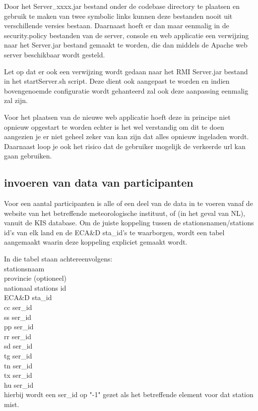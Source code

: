 \documentclass{article}
\begin{document}
Door het Server$_-$xxxx.jar bestand onder de codebase directory te plaatsen en gebruik te maken van 
twee symbolic links kunnen deze bestanden nooit uit verschillende versies bestaan. Daarnaast hoeft er dan maar 
eenmalig in de security.policy bestanden van de server, console en web applicatie een verwijzing naar het 
Server.jar bestand gemaakt te worden, die dan middels de Apache web server beschikbaar wordt gesteld.

Let op dat er ook een verwijzing wordt gedaan naar het RMI Server.jar bestand in het startServer.sh script. 
Deze dient ook aangepast te worden en indien bovengenoemde configuratie wordt gehanteerd zal ook deze 
aanpassing eenmalig zal zijn.

Voor het plaatsen van de nieuwe web applicatie hoeft deze in principe niet opnieuw opgestart te worden 
echter is het wel verstandig om dit te doen aangezien je er niet geheel zeker van kan zijn dat alles opnieuw 
ingeladen wordt. Daarnaast loop je ook het risico dat de gebruiker mogelijk de verkeerde url kan gaan gebruiken.

\subsection*{invoeren van data van participanten}
Voor een aantal participanten is alle of een deel van de data in te voeren vanaf de website van het betreffende meteorologische
instituut, of (in het geval van NL), vanuit de KIS database. Om de juiste koppeling tussen de stationsnamen/stations id's van elk 
land en de ECA\&D sta\_id's te waarborgen, wordt een tabel aangemaakt waarin deze koppeling expliciet gemaakt wordt.

In die tabel staan achtereenvolgens:\\
stationsnaam\\ 
provincie (optioneel)\\
nationaal stations id \\
ECA\&D sta\_id\\
cc ser\_id \\
ss ser\_id \\
pp ser\_id \\
rr ser\_id \\
sd ser\_id \\
tg ser\_id \\
tn ser\_id \\
tx ser\_id \\
hu ser\_id \\
hierbij wordt een ser\_id op "-1" gezet als het betreffende element voor dat station mist.
\end{document}
